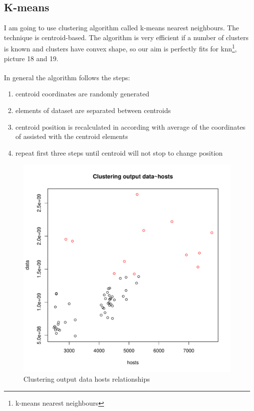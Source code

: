 \documentclass[english]{article}
\begin{document}
\subsection{K-means}
I am going to use clustering algorithm called k-means nearest neighbours. The technique is centroid-based. The algorithm is very efficient if a number of clusters is known and clusters have convex shape, so our aim is perfectly fits for knn\footnote{k-means nearest neighbours}, picture 18 and 19.\\\\
In general the algorithm follows the steps:
\begin{enumerate}
\item centroid coordinates are randomly generated
\item elements of dataset are separated between centroids
\item centroid position is recalculated in according with average of the coordinates of assisted with the centroid elements 
\item repeat first three steps until centroid will not stop to change position
\end{enumerate}
\begin{figure}
\centerline{\includegraphics{Weblogs/ClusteringOutput2}}
\caption{Clustering output data hosts relationships}
\end{figure}
\end{document}
